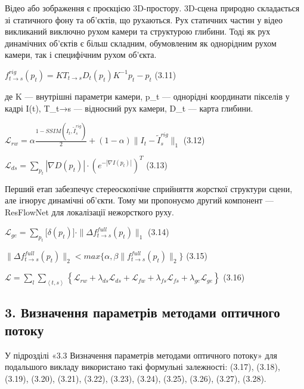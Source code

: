 \documentclass[
]{article}
\begin{document}
Відео або зображення є проєкцією 3D-простору. 3D-сцена природно складається зі статичного фону та об'єктів, що рухаються. Рух статичних частин у відео викликаний виключно рухом камери та структурою глибини. Тоді як рух динамічних об'єктів є більш складним, обумовленим як однорідним рухом камери, так і специфічним рухом об'єкта.

\(f_{t \rightarrow s}^{rig}\left( p_{t} \right) = KT_{t \rightarrow s}D_{t}\left( p_{t} \right)K^{- 1}p_{t} - p_{t}\) (3.11)

де K --- внутрішні параметри камери, p\_t --- однорідні координати пікселів у кадрі I(t), T\_t→s --- відносний рух камери, D\_t --- карта глибини.

\(\mathcal{L}_{rw} = \alpha\frac{1 - SSIM\left( I_{t},{\widetilde{I}}_{s}^{rig} \right)}{2} + (1 - \alpha)\| I_{t} - {\widetilde{I}}_{s}^{rig}\|_{1}\) (3.12)

\(\mathcal{L}_{ds} = \sum_{p_{t}}^{}{|\nabla D(p_{t})| \cdot (e^{- \left| \nabla I\left( p_{t} \right) \right|})^{T}}\) (3.13)

Перший етап забезпечує стереоскопічне сприйняття жорсткої структури сцени, але ігнорує динамічні об'єкти. Тому ми пропонуємо другий компонент --- ResFlowNet для локалізації нежорсткого руху.

\(\mathcal{L}_{ge} = \sum_{p_{t}}^{}{\lbrack\delta(p_{t})\rbrack \cdot \|\Delta f_{t \rightarrow s}^{full}(p_{t})\|_{1}}\) (3.14)

\(\|\Delta f_{t \rightarrow s}^{full}(p_{t})\|_{2} < max\{\alpha,\beta\| f_{t \rightarrow s}^{full}(p_{t})\|_{2}\}\) (3.15)

\(\mathcal{L} = \sum_{l}^{}{\sum_{\left\langle t,s \right\rangle}^{}\left\{ \mathcal{L}_{rw} + \lambda_{ds}\mathcal{L}_{ds} + \mathcal{L}_{fw} + \lambda_{fs}\mathcal{L}_{fs} + \lambda_{ge}\mathcal{L}_{ge} \right\}}\) (3.16)

\subsection{3. Визначення параметрів методами оптичного потоку}\label{ux432ux438ux437ux43dux430ux447ux435ux43dux43dux44f-ux43fux430ux440ux430ux43cux435ux442ux440ux456ux432-ux43cux435ux442ux43eux434ux430ux43cux438-ux43eux43fux442ux438ux447ux43dux43eux433ux43e-ux43fux43eux442ux43eux43aux443}

У підрозділі «3.3 Визначення параметрів методами оптичного потоку» для подальшого викладу використано такі формульні залежності: (3.17), (3.18), (3.19), (3.20), (3.21), (3.22), (3.23), (3.24), (3.25), (3.26), (3.27), (3.28).
\end{document}

